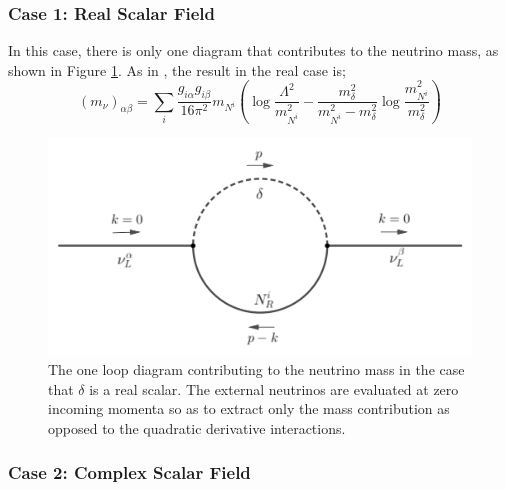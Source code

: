 \documentclass[11pt]{article}
\numberwithin{equation}{section}
\numberwithin{figure}{section}
\numberwithin{table}{section}
\begin{document}
\subsubsection{Case 1: Real Scalar Field}
In this case, there is only one diagram that contributes to the neutrino mass, as shown in Figure \ref{fig:onelooprealdiag}. As in \cite{Farzan2010, Boehm2006, Farzan2011}, the result in the real case is;
\begin{equation}\label{eq:oneloopmass result}
  (m_\nu)_{\alpha\beta} = \sum_{i}{\frac{g_{i\alpha}g_{i\beta}}{16\pi^2}m_{N^i}\left(\log\frac{\Lambda^2}{m_{N^i}^2} - \frac{m_\delta^2}{m_{N^i}^2 - m_\delta^2}\log\frac{m_{N^i}^2}{m_\delta^2}\right)}
\end{equation}
\begin{figure}
  \centering
  \includegraphics[width=0.7\linewidth]{oneloopreal}
  \caption{The one loop diagram contributing to the neutrino mass in the case that $\delta$ is a real scalar. The external neutrinos are evaluated at zero incoming momenta so as to extract only the mass contribution as opposed to the quadratic derivative interactions.}
  \label{fig:onelooprealdiag}
\end{figure}

\subsubsection{Case 2: Complex Scalar Field}
\end{document}
